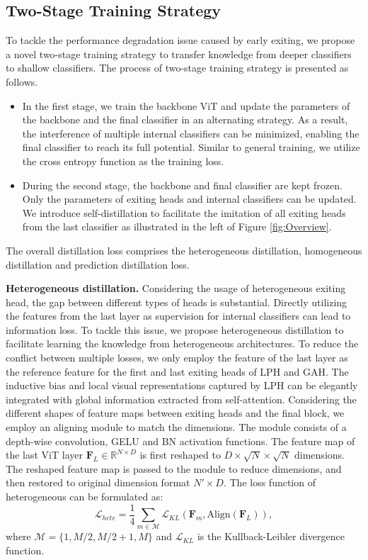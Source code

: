 \subsection{Two-Stage Training Strategy}
To tackle the performance degradation issue caused by early exiting, 
we propose a novel two-stage training strategy to transfer knowledge from deeper classifiers to shallow classifiers. 
The process of two-stage training strategy is presented as follows. 
\begin{itemize}
  \item In the first stage, we train the backbone ViT and update the parameters of the backbone and the final classifier in an alternating strategy. 
  As a result, the interference of multiple internal classifiers can be minimized, enabling the final classifier to reach its full potential. 
  Similar to general training, we utilize the cross entropy function as the training loss. 
  \item During the second stage, the backbone and final classifier are kept frozen. Only the parameters of exiting heads and internal classifiers can be updated. 
  We introduce self-distillation to facilitate the imitation of all exiting heads from the last classifier as illustrated in the left of Figure \ref{fig:Overview}. 
\end{itemize}

The overall distillation loss comprises the heterogeneous distillation, homogeneous distillation and prediction distillation loss.

\textbf{Heterogeneous distillation. }
Considering the usage of heterogeneous exiting head, the gap between different types of heads is substantial. 
Directly utilizing the features from the last layer as supervision for internal classifiers can lead to information loss. 
To tackle this issue, we propose heterogeneous distillation to facilitate learning the knowledge from heterogeneous architectures. 
To reduce the conflict between multiple losses, we only employ the feature of the last layer as the reference feature for the first and last exiting heads of LPH and GAH. 
The inductive bias and local visual representations captured by LPH can be elegantly integrated with global information extracted from self-attention. 
Considering the different shapes of feature maps between exiting heads and the final block, we employ an aligning module to match the dimensions. 
The module consists of a depth-wise convolution, GELU and BN activation functions. 
The feature map of the last ViT layer $\mathbf{F}_L \in \mathbb{R}^{N\times D}$ is first reshaped to $D\times \sqrt{N}\times \sqrt{N}$ dimensions. 
The reshaped feature map is passed to the module to reduce dimensions, and then restored to original dimension format $N'\times D$. 
The loss function of heterogeneous can be formulated as: 
\begin{equation}
  \mathcal{L}_{hete}=\frac{1}{4}\sum_{m \in \mathcal{M} }\mathcal{L}_{KL}(\mathbf{F}_{m}, \text{Align}(\mathbf{F}_L)), 
\end{equation}
where $\mathcal{M}= \{1,M/2,M/2+1,M\}$ and $\mathcal{L}_{KL}$ is the Kullback-Leibler divergence function. 


